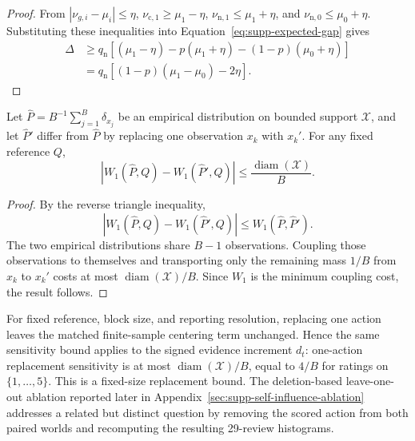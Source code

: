 \begin{proof}
From $|\nu_{g,i}-\mu_i|\leq\eta$,
$\nu_{\mathrm c,1}\geq\mu_1-\eta$,
$\nu_{\mathrm n,1}\leq\mu_1+\eta$, and
$\nu_{\mathrm n,0}\leq\mu_0+\eta$.
Substituting these inequalities into
Equation~\eqref{eq:supp-expected-gap} gives
\begin{align*}
\Delta
&\geq
q_{\mathrm n}
\left[
(\mu_1-\eta)
-p(\mu_1+\eta)
-(1-p)(\mu_0+\eta)
\right] \\
&=
q_{\mathrm n}
\left[
(1-p)(\mu_1-\mu_0)-2\eta
\right].
\end{align*}
\end{proof}

\begin{lemma}
\label{lem:supp-w1-sensitivity}
Let
$\widehat P=B^{-1}\sum_{j=1}^{B}\delta_{x_j}$
be an empirical distribution on bounded support $\mathcal X$, and let
$\widehat P'$ differ from $\widehat P$ by replacing one observation
$x_k$ with $x_k'$. For any fixed reference $Q$,
\begin{equation}
\label{eq:supp-w1-sensitivity}
\left|
W_1(\widehat P,Q)-W_1(\widehat P',Q)
\right|
\leq
\frac{\operatorname{diam}(\mathcal X)}{B}.
\end{equation}
\end{lemma}

\begin{proof}
By the reverse triangle inequality,
\[
\left|
W_1(\widehat P,Q)-W_1(\widehat P',Q)
\right|
\leq
W_1(\widehat P,\widehat P').
\]
The two empirical distributions share $B-1$ observations. Coupling those
observations to themselves and transporting only the remaining mass $1/B$
from $x_k$ to $x_k'$ costs at most
$\operatorname{diam}(\mathcal X)/B$. Since $W_1$ is the minimum coupling
cost, the result follows.
\end{proof}

For fixed reference, block size, and reporting resolution, replacing one
action leaves the matched finite-sample centering term unchanged. Hence the
same sensitivity bound applies to the signed evidence increment $d_t$:
one-action replacement sensitivity is at most
$\operatorname{diam}(\mathcal X)/B$, equal to $4/B$ for ratings on
$\{1,\ldots,5\}$. This is a fixed-size replacement bound. The deletion-based
leave-one-out ablation reported later in
Appendix~\ref{sec:supp-self-influence-ablation} addresses a related
but distinct question by removing the scored action from both paired worlds
and recomputing the resulting 29-review histograms.

